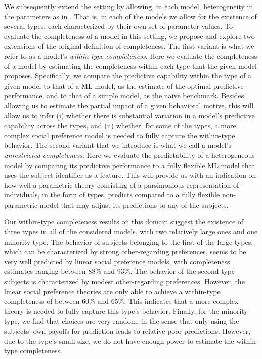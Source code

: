 \documentclass[11pt,a4paper]{article}
\theoremstyle{definition}
\begin{document}
We subsequently extend the setting by allowing, in each model, heterogeneity in the parameters as in \cite{Bruhin2019}. That is, in each of the models we allow for the existence of several types, each characterized by their own set of parameter values. To evaluate the completeness of a model in this setting, we propose and explore two extensions of the original definition of completeness. The first variant is what we refer to as a model's \emph{within-type completeness}. Here we evaluate the completeness of a model by estimating the completeness within each type that the given model proposes. Specifically, we compare the predictive capability within the type of a given model to that of a ML model, as the estimate of the optimal predictive performance, and to that of a simple model, as the naive benchmark. Besides allowing us to estimate the partial impact of a given behavioral motive, this will allow us to infer (i) whether there is substantial variation in a model's predictive capability across the types, and (ii) whether, for some of the types, a more complex social preference model is needed to fully capture the within-type behavior.
The second variant that we introduce is what we call a model's \emph{unrestricted completeness}. Here we evaluate the predictability of a heterogeneous model by comparing its predictive performance to a fully flexible ML model that uses the subject identifier as a feature.  This will provide us with an indication on how well a parametric theory consisting of a parsimonious representation of individuals, in the form of types, predicts compared to a fully flexible non-parametric model that may adjust its predictions to any of the subjects.

Our within-type completeness results on this domain suggest the existence of three types in all of the considered models, with two relatively large ones and one minority type. The behavior of subjects belonging to the first of the large types, which can be characterized by strong other-regarding preferences, seems to be very well predicted by linear social preference models, with completeness estimates ranging between 88\% and 93\%.  The behavior of the second-type subjects is characterized by modest other-regarding preferences. However, the linear social preference theories are only able to achieve a within-type completeness of between 60\% and 65\%. This indicates that a more complex theory is needed to fully capture this type's behavior. Finally, for the minority type, we find that choices are very random, in the sense that only using the subjects' own payoffs for prediction leads to relative poor predictions. However,  due to the type's small size, we do not have enough power to estimate the within-type completeness.
\end{document}
